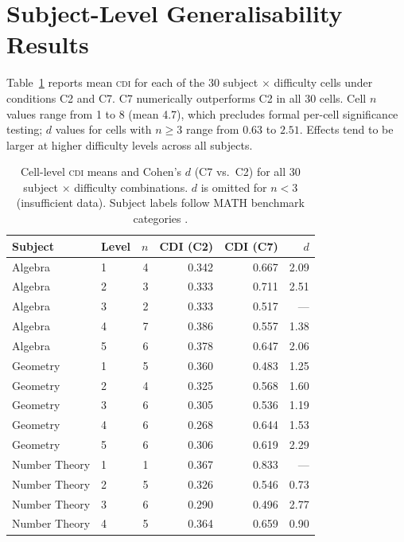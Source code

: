 \documentclass{article}
\newcommand{\CDI}{\textsc{cdi}}
\begin{document}
\section{Subject-Level Generalisability Results}
\label{app:heatmap}

Table~\ref{tab:heatmap} reports mean \CDI{} for each of the 30
subject $\times$ difficulty cells under conditions C2 and C7. C7
numerically outperforms C2 in all 30 cells. Cell $n$ values range from
1 to 8 (mean 4.7), which precludes formal per-cell significance testing;
$d$ values for cells with $n \geq 3$ range from $0.63$ to $2.51$.
Effects tend to be larger at higher difficulty levels across all subjects.

\begin{table}[h]
  \caption{Cell-level \CDI{} means and Cohen's $d$ (C7 vs.\ C2) for
  all 30 subject $\times$ difficulty combinations. $d$ is omitted for
  $n < 3$ (insufficient data). Subject labels follow MATH benchmark
  categories \citep{hendrycks2021math}.}
  \label{tab:heatmap}
  \centering
  \small
  \begin{tabular}{llrrrr}
    \toprule
    \textbf{Subject} & \textbf{Level} & \textbf{$n$} &
    \textbf{CDI (C2)} & \textbf{CDI (C7)} & \textbf{$d$} \\
    \midrule
    Algebra         & 1 &  4 & 0.342 & 0.667 & 2.09 \\
    Algebra         & 2 &  3 & 0.333 & 0.711 & 2.51 \\
    Algebra         & 3 &  2 & 0.333 & 0.517 & --- \\
    Algebra         & 4 &  7 & 0.386 & 0.557 & 1.38 \\
    Algebra         & 5 &  6 & 0.378 & 0.647 & 2.06 \\
    \midrule
    Geometry        & 1 &  5 & 0.360 & 0.483 & 1.25 \\
    Geometry        & 2 &  4 & 0.325 & 0.568 & 1.60 \\
    Geometry        & 3 &  6 & 0.305 & 0.536 & 1.19 \\
    Geometry        & 4 &  6 & 0.268 & 0.644 & 1.53 \\
    Geometry        & 5 &  6 & 0.306 & 0.619 & 2.29 \\
    \midrule
    Number Theory   & 1 &  1 & 0.367 & 0.833 & --- \\
    Number Theory   & 2 &  5 & 0.326 & 0.546 & 0.73 \\
    Number Theory   & 3 &  6 & 0.290 & 0.496 & 2.77 \\
    Number Theory   & 4 &  5 & 0.364 & 0.659 & 0.90 \\

\end{tabular}
\end{table}
\end{document}
